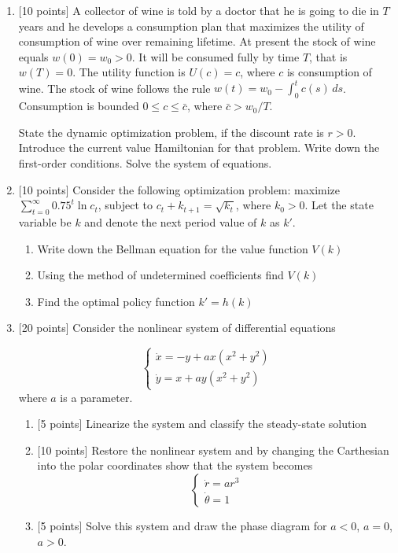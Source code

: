 \documentclass[12pt, a4paper]{article}
\begin{document}
\begin{enumerate}
\item $[$10 points] A collector of wine is told by a doctor that he is going to die in $T$ years and he develops a consumption plan that maximizes the utility of consumption of wine over remaining lifetime. At present the stock of wine equals $w(0)=w_0>0$. It will be consumed fully by time $T$, that is $w(T)=0$. The utility function is $U(c)=c$, where $c$ is consumption of wine. The stock of wine follows the rule $w(t)=w_0-\int_0^t c(s) \, ds$. Consumption is bounded $0\leq c \leq \bar{c}$, where $\bar{c}>w_0/T$.

State the dynamic optimization problem, if the discount rate is $r>0$. Introduce the current value Hamiltonian for that problem. Write down the first-order conditions. Solve the system of equations.

\item $[$10 points] Consider the following optimization problem: maximize $\sum_{t=0}^{\infty} 0.75^t \ln c_t$, subject to $c_t+k_{t+1}=\sqrt{k_t}$, where $k_0>0$. Let the state variable be $k$ and denote the next period value of $k$ as $k'$.

\begin{enumerate}
\item Write down the Bellman equation for the value function $V(k)$
\item Using the method of undetermined coefficients find $V(k)$
\item Find the optimal policy function $k'=h(k)$
\end{enumerate}

\item $[$20 points] Consider the nonlinear system of differential equations

\[
\begin{cases}
\dot{x}=-y+ax(x^2+y^2) \\
\dot{y}=x+ay(x^2+y^2)
\end{cases}
\]
where $a$ is a parameter.

\begin{enumerate}
\item $[$5 points] Linearize the system and classify the steady-state solution
\item $[$10 points] Restore the nonlinear system and by changing the Carthesian  into the polar coordinates show that the system becomes
\[
\begin{cases}
\dot{r}=ar^3 \\
\dot{\theta}=1
\end{cases}
\]

\item $[$5 points] Solve this system and draw the phase diagram for $a<0$, $a=0$, $a>0$.
\end{enumerate}


\end{enumerate}
\end{document}
